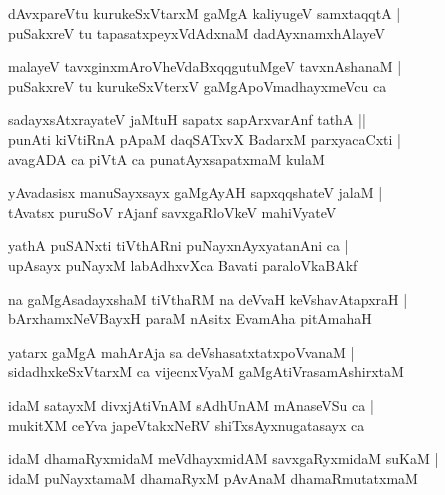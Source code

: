 \documentclass[twoside,12pt,openright]{book}
\newcounter{shloka}[chapter]
\begin{document}
\begin{shloka}
dAvxpareVtu kurukeSxVtarxM gaMgA kaliyugeV samxtaqqtA |\\
puSakxreV tu tapasatxpeyxVdAdxnaM dadAyxnamxhAlayeV 
\end{shloka}

\begin{shloka}
malayeV tavxginxmAroVheVdaBxqqgutuMgeV tavxnAshanaM |\\
puSakxreV tu kurukeSxVterxV gaMgApoVmadhayxmeVcu ca 
\end{shloka}

\begin{shloka}
sadayxsAtxrayateV jaMtuH sapatx sapArxvarAnf tathA ||\\
punAti kiVtiRnA pApaM daqSATxvX BadarxM parxyacaCxti |\\
avagADA ca piVtA ca punatAyxsapatxmaM kulaM 
\end{shloka}

\begin{shloka}
yAvadasisx manuSayxsayx gaMgAyAH sapxqqshateV jalaM |\\
tAvatsx puruSoV rAjanf savxgaRloVkeV mahiVyateV 
\end{shloka}

\begin{shloka}
yathA puSANxti tiVthARni puNayxnAyxyatanAni ca |\\
upAsayx puNayxM labAdhxvXca Bavati paraloVkaBAkf
\end{shloka}

\begin{shloka}
na gaMgAsadayxshaM tiVthaRM na deVvaH keVshavAtapxraH |\\
bArxhamxNeVBayxH paraM nAsitx EvamAha pitAmahaH 
\end{shloka}

\begin{shloka}
yatarx gaMgA mahArAja sa deVshasatxtatxpoVvanaM |\\
sidadhxkeSxVtarxM ca vijecnxVyaM gaMgAtiVrasamAshirxtaM 
\end{shloka}

\begin{shloka}
idaM satayxM divxjAtiVnAM sAdhUnAM mAnaseVSu ca |\\
mukitXM ceYva japeVtakxNeRV shiTxsAyxnugatasayx ca 
\end{shloka}

\begin{shloka}
idaM dhamaRyxmidaM meVdhayxmidAM savxgaRyxmidaM suKaM |\\
idaM puNayxtamaM dhamaRyxM pAvAnaM dhamaRmutatxmaM 
\end{shloka}
\end{document}
